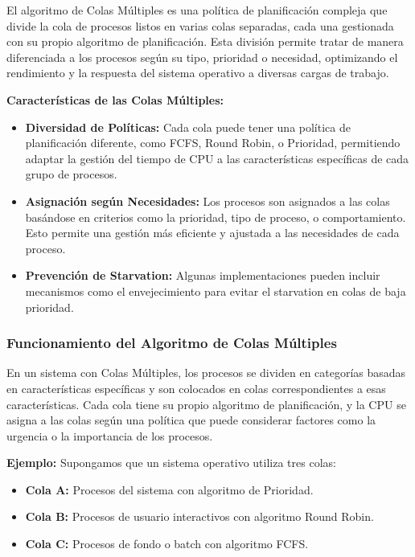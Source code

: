 El algoritmo de Colas Múltiples es una política de planificación compleja que divide la cola de procesos listos en varias colas separadas, cada una gestionada con su propio algoritmo de planificación. Esta división permite tratar de manera diferenciada a los procesos según su tipo, prioridad o necesidad, optimizando el rendimiento y la respuesta del sistema operativo a diversas cargas de trabajo.

\textbf{Características de las Colas Múltiples:}
\begin{itemize}
	\item \textbf{Diversidad de Políticas:} Cada cola puede tener una política de planificación diferente, como FCFS, Round Robin, o Prioridad, permitiendo adaptar la gestión del tiempo de CPU a las características específicas de cada grupo de procesos.
	\item \textbf{Asignación según Necesidades:} Los procesos son asignados a las colas basándose en criterios como la prioridad, tipo de proceso, o comportamiento. Esto permite una gestión más eficiente y ajustada a las necesidades de cada proceso.
	\item \textbf{Prevención de Starvation:} Algunas implementaciones pueden incluir mecanismos como el envejecimiento para evitar el starvation en colas de baja prioridad.
\end{itemize}

\subsubsection{Funcionamiento del Algoritmo de Colas Múltiples}

En un sistema con Colas Múltiples, los procesos se dividen en categorías basadas en características específicas y son colocados en colas correspondientes a esas características. Cada cola tiene su propio algoritmo de planificación, y la CPU se asigna a las colas según una política que puede considerar factores como la urgencia o la importancia de los procesos.

\textbf{Ejemplo:}
Supongamos que un sistema operativo utiliza tres colas:
\begin{itemize}
	\item \textbf{Cola A:} Procesos del sistema con algoritmo de Prioridad.
	\item \textbf{Cola B:} Procesos de usuario interactivos con algoritmo Round Robin.
	\item \textbf{Cola C:} Procesos de fondo o batch con algoritmo FCFS.
\end{itemize}

